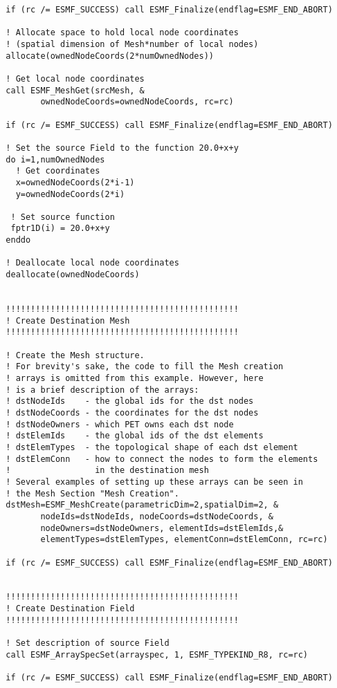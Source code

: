 \begin{verbatim}
  if (rc /= ESMF_SUCCESS) call ESMF_Finalize(endflag=ESMF_END_ABORT)

  ! Allocate space to hold local node coordinates
  ! (spatial dimension of Mesh*number of local nodes)
  allocate(ownedNodeCoords(2*numOwnedNodes))

  ! Get local node coordinates
  call ESMF_MeshGet(srcMesh, &
         ownedNodeCoords=ownedNodeCoords, rc=rc)

  if (rc /= ESMF_SUCCESS) call ESMF_Finalize(endflag=ESMF_END_ABORT)

  ! Set the source Field to the function 20.0+x+y
  do i=1,numOwnedNodes
    ! Get coordinates
    x=ownedNodeCoords(2*i-1)
    y=ownedNodeCoords(2*i)

   ! Set source function
   fptr1D(i) = 20.0+x+y
  enddo

  ! Deallocate local node coordinates
  deallocate(ownedNodeCoords)


  !!!!!!!!!!!!!!!!!!!!!!!!!!!!!!!!!!!!!!!!!!!!!!!
  ! Create Destination Mesh
  !!!!!!!!!!!!!!!!!!!!!!!!!!!!!!!!!!!!!!!!!!!!!!!

  ! Create the Mesh structure.
  ! For brevity's sake, the code to fill the Mesh creation 
  ! arrays is omitted from this example. However, here
  ! is a brief description of the arrays:
  ! dstNodeIds    - the global ids for the dst nodes
  ! dstNodeCoords - the coordinates for the dst nodes
  ! dstNodeOwners - which PET owns each dst node
  ! dstElemIds    - the global ids of the dst elements
  ! dstElemTypes  - the topological shape of each dst element
  ! dstElemConn   - how to connect the nodes to form the elements
  !                 in the destination mesh
  ! Several examples of setting up these arrays can be seen in
  ! the Mesh Section "Mesh Creation". 
  dstMesh=ESMF_MeshCreate(parametricDim=2,spatialDim=2, &
         nodeIds=dstNodeIds, nodeCoords=dstNodeCoords, &
         nodeOwners=dstNodeOwners, elementIds=dstElemIds,&
         elementTypes=dstElemTypes, elementConn=dstElemConn, rc=rc)

  if (rc /= ESMF_SUCCESS) call ESMF_Finalize(endflag=ESMF_END_ABORT)


  !!!!!!!!!!!!!!!!!!!!!!!!!!!!!!!!!!!!!!!!!!!!!!!
  ! Create Destination Field
  !!!!!!!!!!!!!!!!!!!!!!!!!!!!!!!!!!!!!!!!!!!!!!!

  ! Set description of source Field
  call ESMF_ArraySpecSet(arrayspec, 1, ESMF_TYPEKIND_R8, rc=rc)

  if (rc /= ESMF_SUCCESS) call ESMF_Finalize(endflag=ESMF_END_ABORT)


\end{verbatim}
